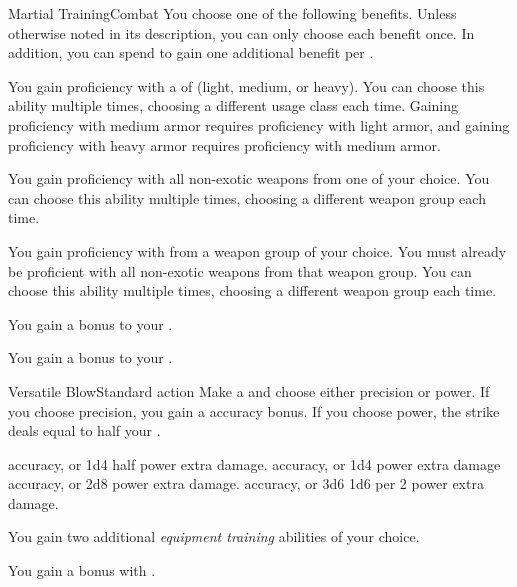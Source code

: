   \begin{feat}{Martial Training}{Combat}
     You choose one of the following benefits.
    Unless otherwise noted in its description, you can only choose each benefit once.
    In addition, you can spend  to gain one additional benefit per .
    \begin{raggeditemize}
      \item You gain proficiency with a  of  (light, medium, or heavy).
        You can choose this ability multiple times, choosing a different usage class each time.
        Gaining proficiency with medium armor requires proficiency with light armor, and gaining proficiency with heavy armor requires proficiency with medium armor.
      \item You gain proficiency with all non-exotic weapons from one  of your choice.
        You can choose this ability multiple times, choosing a different weapon group each time.
      \item You gain proficiency with  from a weapon group of your choice.
        You must already be proficient with all non-exotic weapons from that weapon group.
        You can choose this ability multiple times, choosing a different weapon group each time.
      \item You gain a  bonus to your .
      \item You gain a  bonus to your .
    \end{raggeditemize}

    \begin{activeability}{Versatile Blow}{Standard action}
      \rankline
      Make a  and choose either precision or power.
      If you choose precision, you gain a  accuracy bonus.
      If you choose power, the strike deals  equal to half your .

      \rankline
        accuracy, or 1d4 \add half power extra damage.
        accuracy, or 1d4 \add power extra damage
        accuracy, or 2d8 \add power extra damage.
        accuracy, or 3d6 \add 1d6 per 2 power extra damage.
    \end{activeability}

     You gain two additional \textit{equipment training} abilities of your choice.

     You gain a   bonus with .
  \end{feat}

